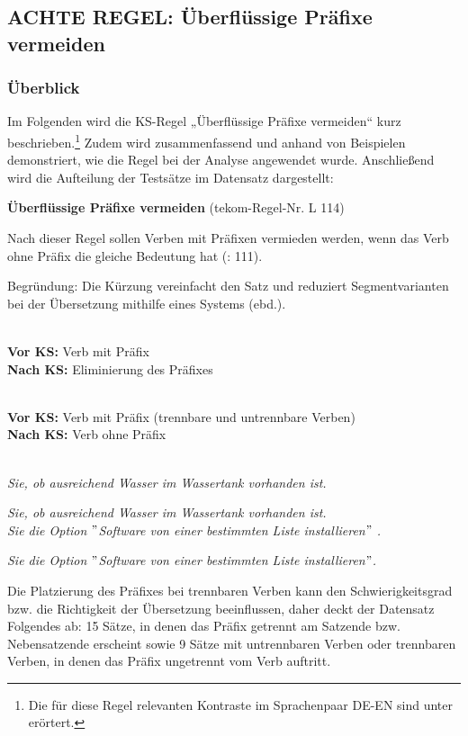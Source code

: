 \subsection{ACHTE REGEL: Überflüssige Präfixe vermeiden}
\label{sec:5.3.8}
 \subsubsection{\label{sec:5.3.8.0}Überblick}

Im Folgenden wird die KS-Regel „Überflüssige Präfixe vermeiden“ kurz beschrieben.\footnote{\textrm{Die für diese Regel relevanten Kontraste im Sprachenpaar DE-EN sind unter  erörtert.} } Zudem wird zusammenfassend und anhand von Beispielen demonstriert, wie die Regel bei der Analyse angewendet wurde. Anschließend wird die Aufteilung der Testsätze im Datensatz dargestellt:

\begin{description}[font=\normalfont\bfseries]
\item [Beschreibung der KS-Regel:] \textbf{Überflüssige Präfixe vermeiden} (tekom-Regel-Nr. L 114)

Nach dieser Regel sollen Verben mit Präfixen vermieden werden, wenn das Verb ohne Präfix die gleiche Bedeutung hat (\citealt{tekom2013}: 111).

Begründung: Die Kürzung vereinfacht den Satz und reduziert Segmentvarianten bei der Übersetzung mithilfe eines Systems (ebd.).

\item[Umsetzungsmuster:]
~\\
\textbf{Vor KS:} Verb mit Präfix\\
\textbf{Nach KS:} Eliminierung des Präfixes

\item[KS-Stelle]
~\\
\textbf{Vor KS:} Verb mit Präfix (trennbare und untrennbare Verben)\\
\textbf{Nach KS:} Verb ohne Präfix

\item[Beispiele]
~\\
\textit{ Sie, ob ausreichend Wasser im Wassertank vorhanden ist.}

\textit{ Sie, ob ausreichend Wasser im Wassertank vorhanden ist.}
~\\
\textit{ Sie die Option $"$Software von einer bestimmten Liste installieren$"$ .}

\textit{ Sie die Option $"$Software von einer bestimmten Liste installieren$"$.}

\item[Aufteilung der Testsätze:]
Die Platzierung des Präfixes bei trennbaren Verben kann den Schwierigkeitsgrad bzw. die Richtigkeit der Übersetzung beeinflussen, daher deckt der Datensatz Folgendes ab: 15 Sätze, in denen das Präfix getrennt am Satzende bzw. Nebensatzende erscheint sowie 9 Sätze mit untrennbaren Verben oder trennbaren Verben, in denen das Präfix ungetrennt vom Verb auftritt.

\end{description}

